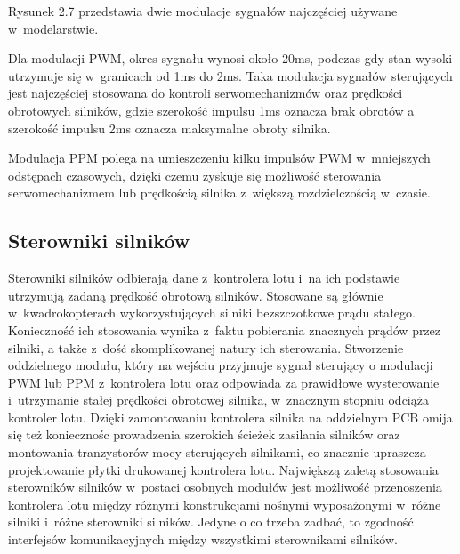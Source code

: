 \documentclass[11pt, twoside]{Thesis} %
\begin{document}
Rysunek 2.7 przedstawia dwie modulacje sygnałów najczęściej używane w~modelarstwie. 

Dla modulacji PWM, okres sygnału wynosi około 20ms, podczas gdy stan wysoki utrzymuje się w~granicach od 1ms do 2ms. Taka modulacja sygnałów sterujących jest najczęściej stosowana do kontroli serwomechanizmów oraz prędkości obrotowych silników, gdzie szerokość impulsu 1ms oznacza brak obrotów a szerokość impulsu 2ms oznacza maksymalne obroty silnika. 

Modulacja PPM polega na umieszczeniu kilku impulsów PWM w~mniejszych odstępach czasowych, dzięki czemu zyskuje się możliwość sterowania serwomechanizmem lub prędkością silnika z~większą rozdzielczością w~czasie.


\subsection{Sterowniki silników}

Sterowniki silników odbierają dane z~kontrolera lotu i~na ich podstawie utrzymują zadaną prędkość obrotową silników. Stosowane są głównie w~kwadrokopterach wykorzystujących silniki bezszczotkowe prądu stałego. Konieczność ich stosowania wynika z~faktu pobierania znacznych prądów przez silniki, a także z~dość skomplikowanej natury ich sterowania. Stworzenie oddzielnego modułu, który na wejściu przyjmuje sygnał sterujący o modulacji PWM lub PPM z~kontrolera lotu oraz odpowiada za prawidłowe wysterowanie i~utrzymanie stałej prędkości obrotowej silnika, w~znacznym stopniu odciąża kontroler lotu. Dzięki zamontowaniu kontrolera silnika na oddzielnym PCB omija się też koniecznośc prowadzenia szerokich ścieżek zasilania silników oraz montowania tranzystorów mocy sterujących silnikami, co znacznie upraszcza projektowanie płytki drukowanej kontrolera lotu. Największą zaletą stosowania sterowników silników w~postaci osobnych modułów jest możliwość przenoszenia kontrolera lotu między różnymi konstrukcjami nośnymi wyposażonymi w~różne silniki i~różne sterowniki silników. Jedyne o co trzeba zadbać, to zgodność interfejsów komunikacyjnych między wszystkimi sterownikami silników. 
\end{document}
